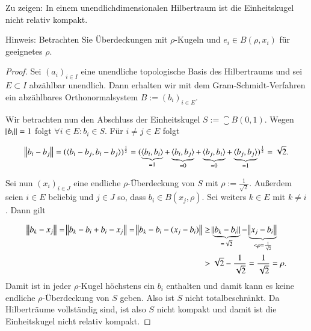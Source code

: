 
\begin{exercise}
  Zu zeigen: In einem unendlichdimensionalen Hilbertraum ist die Einheitskugel nicht relativ kompakt.

  Hinweis: Betrachten Sie Überdeckungen mit $\rho$-Kugeln und $e_i \in B(\rho,x_i)$ für geeignetes $\rho$.
\end{exercise}
\begin{proof}
  Sei ${(a_i)}_{i \in I}$ eine unendliche topologische Basis des Hilbertraums und sei $E \subset I$ abzählbar unendlich. Dann erhalten wir mit dem Gram-Schmidt-Verfahren ein abzählbares Orthonormalsystem $B:={(b_i)}_{i \in E}$.

  Wir betrachten nun den Abschluss der Einheitskugel $S:=\closure{B(0,1)}$. Wegen $\norm{b_i}=1$ folgt $\forall i \in E: b_i \in S$. Für $i \neq j \in E$ folgt

  \begin{equation*}
    \norm{b_i-b_j}={(\langle {b_i-b_j},{b_i-b_j} \rangle)}^{\frac{1}{2}}={(\underbrace{\langle {b_i},{b_i} \rangle}_{=1}+\underbrace{\langle {b_i},{b_j} \rangle}_{=0}+ \underbrace{\langle {b_j},{b_i} \rangle}_{=0} + \underbrace{\langle {b_j},{b_j} \rangle}_{=1})}^{\frac{1}{2}} = \sqrt{2}.
  \end{equation*}

  Sei nun ${(x_i)}_{i \in J}$ eine endliche $\rho$-Überdeckung von $S$ mit $\rho:=\frac{1}{\sqrt{2}}$. Außerdem seien $i \in E$ beliebig und $j \in J$ so, dass $b_i \in B(x_j,\rho)$. Sei weiters $k \in E$ mit $k \neq i$. Dann gilt

  \begin{equation*}
    \begin{split}
      \norm{b_k-x_j}=\norm{b_k-b_i+b_i-x_j}
      =\norm{b_k-b_i-(x_j-b_i)}
      &\geq \underbrace{\norm{b_k-b_i}}_{=\sqrt{2}} - \underbrace{\norm{x_j-b_i}}_{< \rho=\frac{1}{\sqrt{2}}} \\
      &> \sqrt{2}-\frac{1}{\sqrt{2}}=\frac{1}{\sqrt{2}}=\rho.
    \end{split}
  \end{equation*}
  Damit ist in jeder $\rho$-Kugel höchstens ein $b_i$ enthalten und damit kann es keine endliche $\rho$-Überdeckung von $S$ geben. Also ist $S$ nicht totalbeschränkt. Da Hilberträume vollständig sind, ist also $S$ nicht kompakt und damit ist die Einheitskugel nicht relativ kompakt.
\end{proof}
